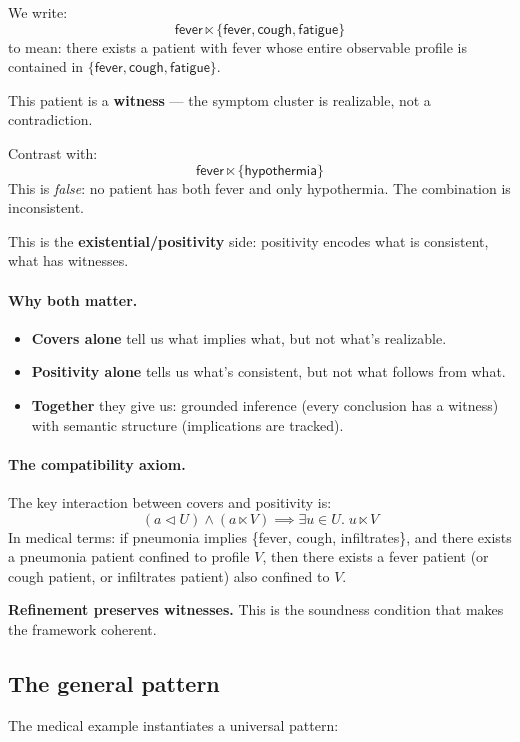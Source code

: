 \documentclass[11pt]{article}
\theoremstyle{definition}
\theoremstyle{plain}
\newcommand{\ltimesrel}{\ltimes}
\newcommand{\covers}{\triangleleft}
\begin{document}
We write:
\[
\mathsf{fever} \ltimesrel \{\mathsf{fever}, \mathsf{cough}, \mathsf{fatigue}\}
\]
to mean: there exists a patient with fever whose entire observable profile is contained in $\{\mathsf{fever}, \mathsf{cough}, \mathsf{fatigue}\}$.

This patient is a \textbf{witness} --- the symptom cluster is realizable, not a contradiction.

Contrast with:
\[
\mathsf{fever} \ltimesrel \{\mathsf{hypothermia}\}
\]
This is \emph{false}: no patient has both fever and only hypothermia. The combination is inconsistent.

This is the \textbf{existential/positivity} side: positivity encodes what is consistent, what has witnesses.

\paragraph{Why both matter.}
\begin{itemize}
  \item \textbf{Covers alone} tell us what implies what, but not what's realizable.
  \item \textbf{Positivity alone} tells us what's consistent, but not what follows from what.
  \item \textbf{Together} they give us: grounded inference (every conclusion has a witness) with semantic structure (implications are tracked).
\end{itemize}

\paragraph{The compatibility axiom.}
The key interaction between covers and positivity is:
\[
(a \covers U) \land (a \ltimesrel V) \implies \exists u \in U.\; u \ltimesrel V
\]
In medical terms: if pneumonia implies \{fever, cough, infiltrates\}, and there exists a pneumonia patient confined to profile $V$,
then there exists a fever patient (or cough patient, or infiltrates patient) also confined to $V$.

\textbf{Refinement preserves witnesses.} This is the soundness condition that makes the framework coherent.

\subsection{The general pattern}

The medical example instantiates a universal pattern:
\end{document}
